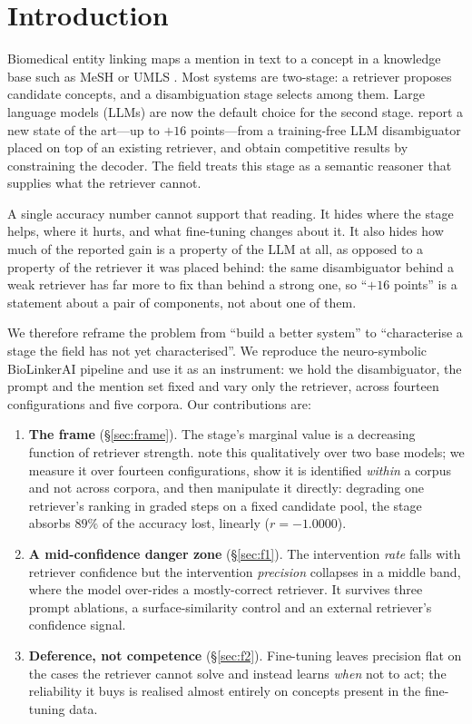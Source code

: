 \documentclass[11pt]{article}
\begin{document}
\section{Introduction}

Biomedical entity linking maps a mention in text to a concept in a knowledge base
such as MeSH or UMLS \citep{bodenreider-2004-umls}. Most systems are two-stage: a
retriever proposes candidate concepts, and a disambiguation stage selects among them.
Large language models (LLMs) are now the default choice for the second stage.
\citet{ye-mitchell-2025-llm} report a new state of the art---up to $+16$ points---from
a training-free LLM disambiguator placed on top of an existing retriever, and
\citet{lin-etal-2025-guiding} obtain competitive results by constraining the decoder.
The field treats this stage as a semantic reasoner that supplies what the retriever
cannot.

A single accuracy number cannot support that reading. It hides where the stage helps,
where it hurts, and what fine-tuning changes about it. It also hides how much of the
reported gain is a property of the LLM at all, as opposed to a property of the
retriever it was placed behind: the same disambiguator behind a weak retriever has far
more to fix than behind a strong one, so ``$+16$ points'' is a statement about a pair
of components, not about one of them.

We therefore reframe the problem from ``build a better system'' to ``characterise a
stage the field has not yet characterised''. We reproduce the neuro-symbolic
BioLinkerAI pipeline \citep{sakor-etal-2024-biolinkerai} and use it as an
instrument: we hold the disambiguator, the prompt and the mention set fixed and vary
only the retriever, across fourteen configurations and five corpora. Our
contributions are:

\begin{enumerate}\itemsep1pt
\item \textbf{The frame} (\S\ref{sec:frame}). The stage's marginal value is a
decreasing function of retriever strength. \citet{ye-mitchell-2025-llm} note this
qualitatively over two base models; we measure it over fourteen configurations, show
it is identified \emph{within} a corpus and not across corpora, and then manipulate
it directly: degrading one retriever's ranking in graded steps on a fixed candidate
pool, the stage absorbs $89\%$ of the accuracy lost, linearly ($r=-1.0000$).
\item \textbf{A mid-confidence danger zone} (\S\ref{sec:f1}). The intervention
\emph{rate} falls with retriever confidence but the intervention \emph{precision}
collapses in a middle band, where the model over-rides a mostly-correct retriever. It
survives three prompt ablations, a surface-similarity control and an external
retriever's confidence signal.
\item \textbf{Deference, not competence} (\S\ref{sec:f2}). Fine-tuning leaves
precision flat on the cases the retriever cannot solve and instead learns \emph{when}
not to act; the reliability it buys is realised almost entirely on concepts present
in the fine-tuning data.
\end{enumerate}
\end{document}
